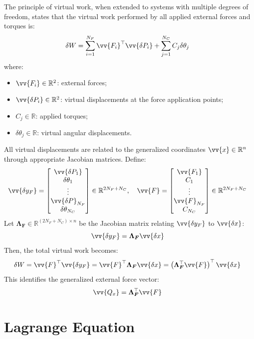 The principle of virtual work, when extended to systems with multiple degrees of freedom, states that the virtual work performed by all applied external forces and torques is:
\[
\delta W = \sum_{i=1}^{N_F} \vv{F_i}^\top \vv{\delta P_i} + \sum_{j=1}^{N_C} C_j  \delta \theta_j
\]
where:
\begin{itemize}
    \item \( \vv{F_i} \in \mathbb{R}^2 \): external forces;
    \item \( \vv{\delta P_i} \in \mathbb{R}^2 \): virtual displacements at the force application points;
    \item \( C_j \in \mathbb{R} \): applied torques;
    \item \( \delta \theta_j \in \mathbb{R} \): virtual angular displacements.
\end{itemize}

All virtual displacements are related to the generalized coordinates \( \vv{x} \in \mathbb{R}^n \) through appropriate Jacobian matrices. Define:
\[
\vv{\delta y_F} =
\begin{bmatrix}
\vv{\delta P_1} \\
\delta \theta_1 \\
\vdots \\
\vv{\delta P}_{N_F} \\
\delta \theta_{N_C}
\end{bmatrix}
\in \mathbb{R}^{2N_F + N_C}, \quad
\vv{F} =
\begin{bmatrix}
\vv{F_1} \\
C_1 \\
\vdots \\
\vv{F}_{N_F} \\
C_{N_C}
\end{bmatrix}
\in \mathbb{R}^{2N_F + N_C}
\]
Let \( \boldsymbol{\Lambda_F} \in \mathbb{R}^{(2N_F + N_C) \times n} \) be the Jacobian matrix relating \( \vv{\delta y_F} \) to \( \vv{\delta x} \):
\[
\vv{\delta y_F} = \boldsymbol{\Lambda_F}  \vv{\delta x}
\]
Then, the total virtual work becomes:
\[
\delta W = \vv{F}^\top  \vv{\delta y_F} = \vv{F}^\top \boldsymbol{\Lambda_F}  \vv{\delta x} 
= \left( \boldsymbol{\Lambda_F}^\top \vv{F} \right)^\top \vv{\delta x}
\]
This identifies the generalized external force vector:
\[
\vv{Q_x} = \boldsymbol{\Lambda_F}^\top  \vv{F}
\]

\section{Lagrange Equation}

